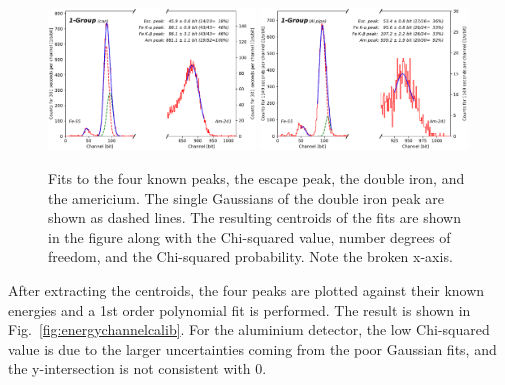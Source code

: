 \begin{figure}[htb]
  \includegraphics[width=0.49\textwidth,page=1]{graphics/channelfits.pdf}
  \includegraphics[width=0.49\textwidth,page=1]{graphics/aluchannelfits.pdf}
  \caption{Fits to the four known peaks, the escape peak, the double iron, and the americium. The single Gaussians of the double iron peak are shown as dashed lines. The resulting centroids of the fits are shown in the figure along with the Chi-squared value, number degrees of freedom, and the Chi-squared probability. Note the broken x-axis.}
  \label{fig:channelfits}
\end{figure}

After extracting the centroids, the four peaks are plotted against their known energies and a 1st order polynomial fit is performed. The result is shown in Fig.~\ref{fig:energychannelcalib}. For the aluminium detector, the low Chi-squared value is due to the larger uncertainties coming from the poor Gaussian fits, and the y-intersection is not consistent with 0.

